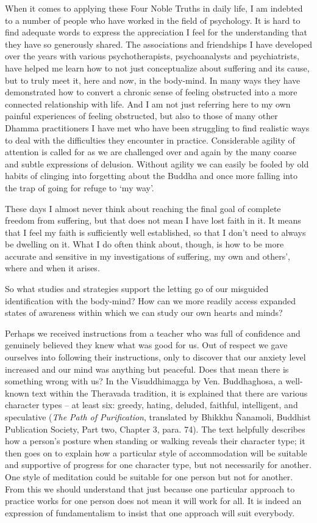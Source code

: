 When it comes to applying these Four Noble Truths in daily life, I am
indebted to a number of people who have worked in the field of
psychology. It is hard to find adequate words to express the
appreciation I feel for the understanding that they have so generously
shared. The associations and friendships I have developed over the years
with various psychotherapists, psychoanalysts and psychiatrists, have
helped me learn how to not just conceptualize about suffering and its
cause, but to truly meet it, here and now, in the body-mind. In many
ways they have demonstrated how to convert a chronic sense of feeling
obstructed into a more connected relationship with life. And I am not
just referring here to my own painful experiences of feeling obstructed,
but also to those of many other Dhamma practitioners I have met who have
been struggling to find realistic ways to deal with the difficulties
they encounter in practice. Considerable agility of attention is called
for as we are challenged over and again by the many coarse and subtle
expressions of delusion. Without agility we can easily be fooled by old
habits of clinging into forgetting about the Buddha and once more
falling into the trap of going for refuge to `my way'.

These days I almost never think about reaching the final goal of
complete freedom from suffering, but that does not mean I have lost
faith in it. It means that I feel my faith is sufficiently well
established, so that I don't need to always be dwelling on it. What I do
often think about, though, is how to be more accurate and sensitive in
my investigations of suffering, my own and others', where and when it
arises.

So what studies and strategies support the letting go of our misguided
identification with the body-mind? How can we more readily access
expanded states of awareness within which we can study our own hearts
and minds?

Perhaps we received instructions from a teacher who was full of
confidence and genuinely believed they knew what was good for us. Out of
respect we gave ourselves into following their instructions, only to
discover that our anxiety level increased and our mind was anything but
peaceful. Does that mean there is something wrong with us? In the
Visuddhimagga by Ven. Buddhaghosa\cite{visuddhimagga}, a well-known text
within the Theravada tradition, it is explained that there are various
character types -- at least six: greedy, hating, deluded, faithful,
intelligent, and speculative (\emph{The Path of Purification},
translated by Bhikkhu Ñanamoli, Buddhist Publication Society, Part two,
Chapter 3, para. 74). The text helpfully describes how a person's
posture when standing or walking reveals their character type; it then
goes on to explain how a particular style of accommodation will be
suitable and supportive of progress for one character type, but not
necessarily for another. One style of meditation could be suitable for
one person but not for another. From this we should understand that just
because one particular approach to practice works for one person does
not mean it will work for all. It is indeed an expression of
fundamentalism to insist that one approach will suit everybody.

